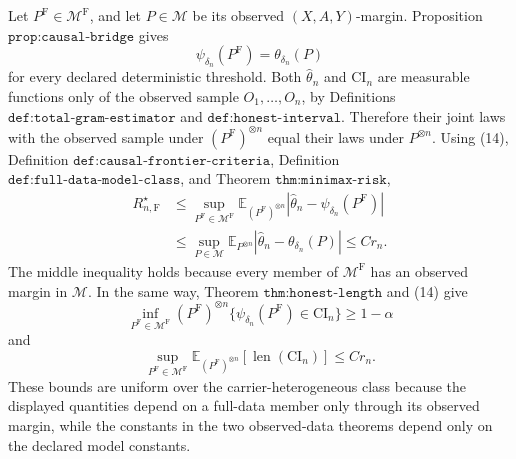 Let \(P^{\mathrm F}\in\mathcal M^{\mathrm F}\), and let \(P\in\mathcal M\) be its observed \((X,A,Y)\)-margin.  Proposition \(\texttt{prop:causal-bridge}\) gives
\[
 \psi_{\delta_n}(P^{\mathrm F})=\theta_{\delta_n}(P)
 \tag{14}
\]
for every declared deterministic threshold.  Both \(\widehat\theta_n\) and \(\mathrm{CI}_n\) are measurable functions only of the observed sample \(O_1,\ldots,O_n\), by Definitions \(\texttt{def:total-gram-estimator}\) and \(\texttt{def:honest-interval}\).  Therefore their joint laws with the observed sample under \((P^{\mathrm F})^{\otimes n}\) equal their laws under \(P^{\otimes n}\).  Using (14), Definition \(\texttt{def:causal-frontier-criteria}\), Definition \(\texttt{def:full-data-model-class}\), and Theorem \(\texttt{thm:minimax-risk}\),
\[
\begin{aligned}
 R_{n,\mathrm F}^\star
 &\leq \sup_{P^{\mathrm F}\in\mathcal M^{\mathrm F}}
 \mathbb E_{(P^{\mathrm F})^{\otimes n}}
 |\widehat\theta_n-\psi_{\delta_n}(P^{\mathrm F})|\\
 &\leq \sup_{P\in\mathcal M}
 \mathbb E_{P^{\otimes n}}|\widehat\theta_n-\theta_{\delta_n}(P)|
 \leq C r_n.
\end{aligned}
\tag{15}
\]
The middle inequality holds because every member of \(\mathcal M^{\mathrm F}\) has an observed margin in \(\mathcal M\).  In the same way, Theorem \(\texttt{thm:honest-length}\) and (14) give
\[
 \inf_{P^{\mathrm F}\in\mathcal M^{\mathrm F}}(P^{\mathrm F})^{\otimes n}
 \{\psi_{\delta_n}(P^{\mathrm F})\in\mathrm{CI}_n\}\geq1-\alpha
 \tag{16}
\]
and
\[
 \sup_{P^{\mathrm F}\in\mathcal M^{\mathrm F}}
 \mathbb E_{(P^{\mathrm F})^{\otimes n}}
 [\operatorname{len}(\mathrm{CI}_n)]\leq C r_n.
 \tag{17}
\]
These bounds are uniform over the carrier-heterogeneous class because the displayed quantities depend on a full-data member only through its observed margin, while the constants in the two observed-data theorems depend only on the declared model constants.

